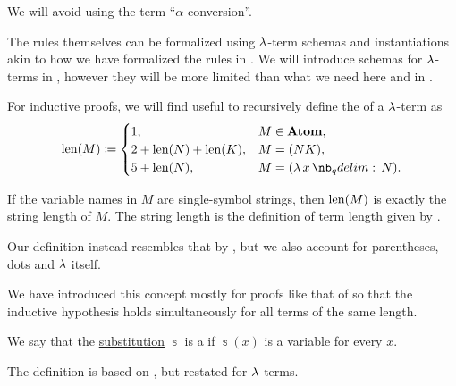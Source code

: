 \begin{comments}
  We will avoid using the term \enquote{\( \alpha \)-conversion}.

  \item The rules themselves can be formalized using \( \mathrm{\lambda} \)-term schemas and instantiations akin to how we have formalized the rules in . We will introduce schemas for \( \mathrm{\lambda} \)-terms in , however they will be more limited than what we need here and in .
\end{comments}

\begin{definition}\label{def:lambda_term_length}\mimprovised
  For inductive proofs, we will find useful to recursively define the  of a \( \mathrm{\lambda} \)-term as
  \begin{equation*}
    \len(M) \coloneqq \begin{cases}
      1,                     &M \in \op*{Atom}, \\
      2 + \len(N) + \len(K), &M = (NK), \\
      5 + \len(N),           &M = (\qabs x N). \\
    \end{cases}
  \end{equation*}
\end{definition}
\begin{comments}
  \item If the variable names in \( M \) are single-symbol strings, then \( \operatorname{len}(M) \) is exactly the \hyperref[def:formal_language/string_length]{string length} of \( M \). The string length is the definition of term length given by .

  Our definition instead resembles that by , but we also account for parentheses, dots and \( \mathrm{\lambda} \) itself.

  \item We have introduced this concept mostly for proofs like that of  so that the inductive hypothesis holds simultaneously for all terms of the same length.
\end{comments}

\begin{definition}\label{def:lambda_renaming}
  We say that the \hyperref[def:lambda_substitution]{substitution} \( \Bbbs \) is a  if \( \Bbbs(x) \) is a variable for every \( x \).
\end{definition}
\begin{comments}
  \item The definition is based on \cite[252]{Mimram2020Types}, but restated for \( \mathrm{\lambda} \)-terms.
\end{comments}

